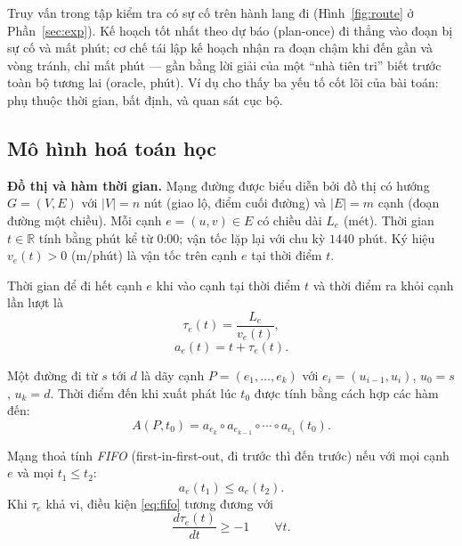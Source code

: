 \begin{vd}\label{vd:real}
Truy vấn \ExampleQuery{} trong tập kiểm tra có \ExampleNInc{} sự cố trên hành lang đi (Hình~\ref{fig:route} ở
Phần~\ref{sec:exp}). Kế hoạch tốt nhất theo dự báo (plan-once) đi thẳng vào đoạn bị sự cố và mất \ExamplePoTT{} phút;
cơ chế tái lập kế hoạch nhận ra đoạn chậm khi đến gần và vòng tránh, chỉ mất \ExampleRpTT{} phút --- gần bằng lời giải
của một ``nhà tiên tri'' biết trước toàn bộ tương lai (oracle, \ExampleOrTT{} phút). Ví dụ cho thấy ba yếu tố cốt lõi
của bài toán: phụ thuộc thời gian, bất định, và quan sát cục bộ.
\end{vd}

\subsection{Mô hình hoá toán học}\label{sec:problem:model}

\textbf{Đồ thị và hàm thời gian.} Mạng đường được biểu diễn bởi đồ thị có hướng $G=(V,E)$ với $|V|=n$ nút (giao lộ,
điểm cuối đường) và $|E|=m$ cạnh (đoạn đường một chiều). Mỗi cạnh $e=(u,v)\in E$ có chiều dài $L_e$ (mét). Thời gian
$t\in\mathbb{R}$ tính bằng phút kể từ 0:00; vận tốc lặp lại với chu kỳ $1440$ phút. Ký hiệu $v_e(t)>0$ (m/phút) là vận tốc
trên cạnh $e$ tại thời điểm $t$.

\begin{dn}\label{dn:arrival}
Thời gian để đi hết cạnh $e$ khi vào cạnh tại thời điểm $t$ và thời điểm ra khỏi cạnh lần lượt là
\begin{equation}
\tau_e(t) = \frac{L_e}{v_e(t)},
\label{eq:tau}
\end{equation}
\begin{equation}
a_e(t) = t + \tau_e(t).
\label{eq:arrival}
\end{equation}
\end{dn}

Một đường đi từ $s$ tới $d$ là dãy cạnh $P=(e_1,\dots,e_k)$ với $e_i=(u_{i-1},u_i)$, $u_0=s$, $u_k=d$. Thời điểm đến
khi xuất phát lúc $t_0$ được tính bằng cách hợp các hàm đến:
\begin{equation}
A(P,t_0) = a_{e_k}\circ a_{e_{k-1}}\circ\cdots\circ a_{e_1}(t_0).
\label{eq:path-arrival}
\end{equation}

\begin{dn}\label{dn:fifo}
Mạng thoả tính \emph{FIFO} (first-in-first-out, đi trước thì đến trước) nếu với mọi cạnh $e$ và mọi $t_1\le t_2$:
\begin{equation}
a_e(t_1)\le a_e(t_2).
\label{eq:fifo}
\end{equation}
Khi $\tau_e$ khả vi, điều kiện \eqref{eq:fifo} tương đương với
\begin{equation}
\frac{d\tau_e(t)}{dt} \ge -1 \qquad \forall t.
\label{eq:fifo-deriv}
\end{equation}
\end{dn}

